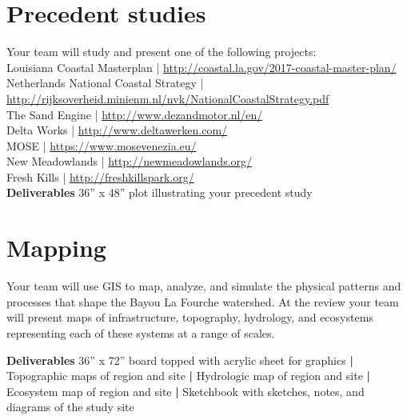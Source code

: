 \documentclass[11pt,article,oneside]{memoir}
\begin{document}
\section{Precedent studies}
\renewcommand*{\bibfont}{\footnotesize}
Your team will study and present one of the following projects:
\\

\noindent
Louisiana Coastal Masterplan | \url{http://coastal.la.gov/2017-coastal-master-plan/}\\
Netherlands National Coastal Strategy | \\
\url{http://rijksoverheid.minienm.nl/nvk/NationalCoastalStrategy.pdf}\\
The Sand Engine | \url{http://www.dezandmotor.nl/en/}\\
Delta Works | \url{http://www.deltawerken.com/}\\
MOSE | \url{https://www.mosevenezia.eu/}\\
New Meadowlands | \url{http://newmeadowlands.org/}\\
Fresh Kills | \url{http://freshkillspark.org/}\\

\vspace*{0.5em}
\noindent \textbf{Deliverables} 
36'' x 48'' plot illustrating your precedent study
\\

\section{Mapping}
Your team will use GIS to map, analyze, and simulate 
the physical patterns and processes that shape
the Bayou La Fourche watershed. 
At the review your team will present
maps of infrastructure, topography, hydrology, and ecosystems
representing each of these systems at a range of scales. 

\vspace*{0.5em}
\noindent \textbf{Deliverables} 
36'' x 72'' board topped with acrylic sheet for graphics \textbf{|}
Topographic maps of region and site \textbf{|}
Hydrologic map of region and site \textbf{|}
Ecosystem map of region and site \textbf{|}
Sketchbook with sketches, notes, and diagrams of the study site 
\end{document}
